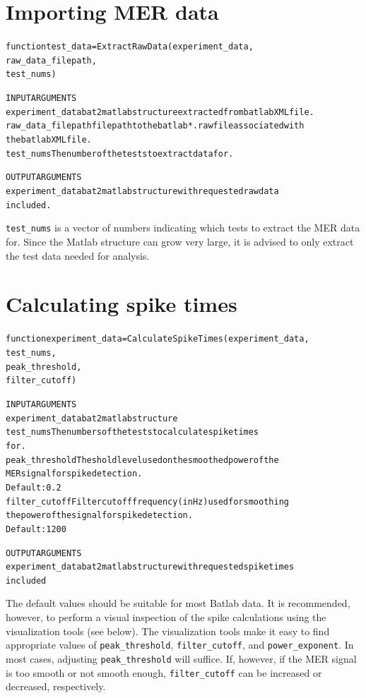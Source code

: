\documentclass[11pt,letterpaper]{article}
\begin{document}
\section{Importing MER data}
\begin{footnotesize}
\begin{alltt}
function test_data = ExtractRawData(experiment_data,
                                    raw_data_filepath,
                                    test_nums)

   INPUT ARGUMENTS
   experiment_data     bat2matlab structure extracted from batlab XML file.
   raw_data_filepath   file path to the batlab *.raw file associated with
                       the batlab XML file.
   test_nums           The number of the tests to extract data for.

   OUTPUT ARGUMENTS
   experiment_data     bat2matlab structure with requested raw data
                       included.
\end{alltt}
\end{footnotesize}
\verb"test_nums" is a vector of numbers indicating which tests to
extract the MER data for. Since the Matlab structure can grow very
large, it is advised to only extract the test data needed for
analysis.

\section{Calculating spike times}
\begin{footnotesize}
\begin{alltt}
function experiment_data = CalculateSpikeTimes(experiment_data,
                                               test_nums,
                                               peak_threshold,
                                               filter_cutoff)

   INPUT ARGUMENTS
   experiment_data     bat2matlab structure
   test_nums           The numbers of the tests to calculate spike times
                       for.
   peak_threshold      Theshold level used on the smoothed power of the
                       MER signal for spike detection.
                       Default: 0.2
   filter_cutoff       Filter cutoff frequency (in Hz) used for smoothing
                       the power of the signal for spike detection.
                       Default: 1200

   OUTPUT ARGUMENTS
   experiment_data     bat2matlab structure with requested spike times
                       included
\end{alltt}
\end{footnotesize}
The default values should be suitable for most Batlab data. It is
recommended, however, to perform a visual inspection of the spike
calculations using the visualization tools (see below). The
visualization tools make it easy to find appropriate values of
\verb"peak_threshold", \verb"filter_cutoff", and
\verb"power_exponent". In most cases, adjusting
\verb"peak_threshold" will suffice. If, however, if the MER signal
is too smooth or not smooth enough, \verb"filter_cutoff" can be
increased or decreased, respectively.
\end{document}
